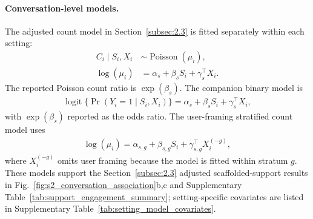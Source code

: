 \paragraph{Conversation-level models.}
The adjusted count model in Section~\ref{subsec:2.3} is fitted separately within each setting:
\begin{align*}
C_i \mid S_i, X_i &\sim \operatorname{Poisson}(\mu_i),\\
\log(\mu_i) &= \alpha_s + \beta_s S_i + \gamma_s^\top X_i .
\end{align*}
The reported Poisson count ratio is $\exp(\beta_s)$. The companion binary model is
\begin{align*}
\operatorname{logit}\{\Pr(Y_i=1 \mid S_i, X_i)\}
  = \alpha_s + \beta_s S_i + \gamma_s^\top X_i ,
\end{align*}
with $\exp(\beta_s)$ reported as the odds ratio. The user-framing stratified count model uses
\begin{align*}
\log(\mu_i) = \alpha_{s,g} + \beta_{s,g} S_i + \gamma_{s,g}^{\top} X_i^{(-g)},
\end{align*}
where $X_i^{(-g)}$ omits user framing because the model is fitted within stratum $g$.
These models support the Section~\ref{subsec:2.3} adjusted scaffolded-support results in Fig.~\ref{fig:s2_conversation_association}b,c and Supplementary Table~\ref{tab:support_engagement_summary}; setting-specific covariates are listed in Supplementary Table~\ref{tab:setting_model_covariates}.

